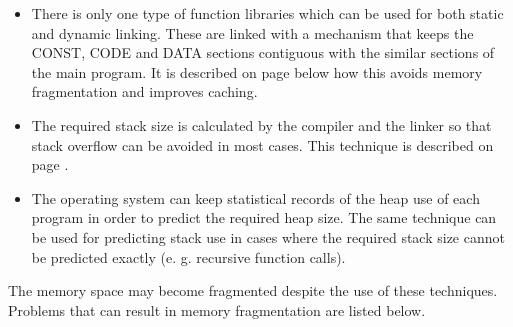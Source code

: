 \documentclass[forwardcom.tex]{subfiles}
\begin{document}
\begin{itemize}
\item There is only one type of function libraries which can be used for both static and dynamic linking. These are linked with a mechanism that keeps the CONST, CODE and DATA sections contiguous with the similar sections of the main program. It is described on page \pageref{libraryLinkMethods} below how this avoids memory fragmentation and improves caching.

\item The required stack size is calculated by the compiler and the linker so that stack overflow can be avoided in most cases. This technique is described on page \pageref{predictingStackSize}.

\item The operating system can keep statistical records of the heap use of each program in order to predict the required heap size. The same technique can be used for predicting stack use in cases where the required stack size cannot be predicted exactly (e. g. recursive function calls). 
\end{itemize}

The memory space may become fragmented despite the use of these techniques. Problems that can result in memory fragmentation are listed below. 
\end{document}
